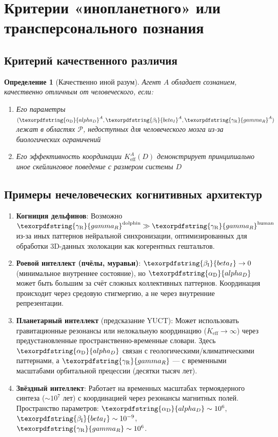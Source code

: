 \documentclass[12pt,a4paper]{article}
\newtheorem{definition}{Определение}
\DeclareRobustCommand{\alD}{\texorpdfstring{\ensuremath{\alpha_{\mathrm{D}}}}{alpha_D}}
\DeclareRobustCommand{\beI}{\texorpdfstring{\ensuremath{\beta_{\mathrm{I}}}}{beta_I}}
\DeclareRobustCommand{\gaR}{\texorpdfstring{\ensuremath{\gamma_{\mathrm{R}}}}{gamma_R}}
\newcommand{\eff}{\mathrm{eff}}
\newcommand{\Ke}{K_{\eff}}
\begin{document}
	\section{Критерии «инопланетного» или трансперсонального познания}
	
	\subsection{Критерий качественного различия}
	
	\begin{definition}[Качественно иной разум]
		Агент \(A\) обладает сознанием, качественно отличным от человеческого, если:
		\begin{enumerate}
			\item Его параметры \((\alD^A, \beI^A, \gaR^A)\) лежат в областях \(\mathcal{P}\), недоступных для человеческого мозга из-за биологических ограничений
			\item Его эффективность координации \(\Ke^A(D)\) демонстрирует принципиально иное скейлинговое поведение с размером системы \(D\)
		\end{enumerate}
	\end{definition}
	
	\subsection{Примеры нечеловеческих когнитивных архитектур}
	
	\begin{enumerate}
		\item \textbf{Когниция дельфинов}: Возможно \(\gaR^{\mathrm{dolphin}} \gg \gaR^{\mathrm{human}}\) из-за иных паттернов нейральной синхронизации, оптимизированных для обработки 3D-данных эхолокации как когерентных гештальтов.
		
		\item \textbf{Роевой интеллект (пчёлы, муравьи)}: \(\beI \to 0\) (минимальное внутреннее состояние), но \(\alD\) может быть большим за счёт сложных коллективных паттернов. Координация происходит через средовую стигмергию, а не через внутренние репрезентации.
		
		\item \textbf{Планетарный интеллект} (предсказание YUCT): Может использовать гравитационные резонансы или нелокальную координацию (\(\Ke \to \infty\)) через предустановленные пространственно-временные словари. Здесь \(\alD\) связан с геологическими/климатическими паттернами, а \(\gaR\) — с временными масштабами орбитальной прецессии (десятки тысяч лет).
		
		\item \textbf{Звёздный интеллект}: Работает на временных масштабах термоядерного синтеза (\(\sim 10^7\) лет) с координацией через резонансы магнитных полей. Пространство параметров: \(\alD \sim 10^6\), \(\beI \sim 10^{-9}\), \(\gaR \sim 10^6\).
	\end{enumerate}
	
\end{document}
